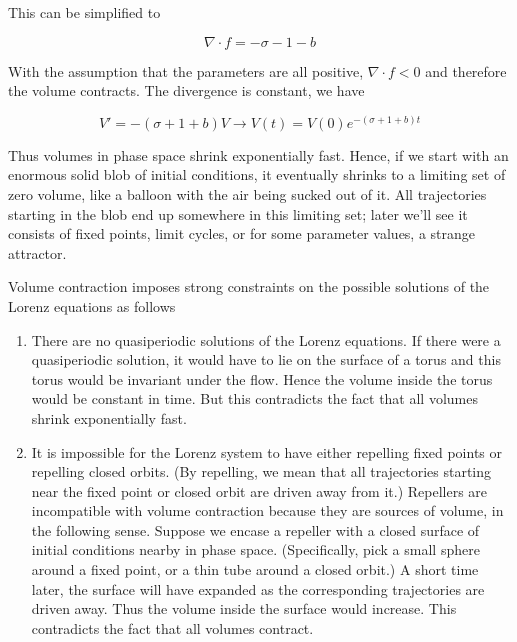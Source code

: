 This can be simplified to

\begin{equation*}
    \nabla \cdot f = - \sigma - 1 - b
\end{equation*}

With the assumption that the parameters are all positive, $\nabla \cdot f < 0$ and therefore the volume contracts. The divergence is constant, we have

\begin{equation*}
    V' = - (\sigma + 1 + b)V \rightarrow V(t) = V(0) e^{ - (\sigma + 1 + b) t}
\end{equation*}

Thus volumes in phase space shrink exponentially fast. Hence, if we start with an enormous solid blob of initial conditions, it eventually shrinks to a limiting set of zero volume, like a balloon with the air being sucked out of it. All trajectories starting in  the blob end up somewhere in this limiting set; later we’ll see it consists of fixed points, limit cycles, or for some parameter values, a strange attractor.

Volume contraction imposes strong constraints on the possible solutions of the Lorenz equations as follows

\begin{enumerate}
    \item There are no quasiperiodic solutions of the Lorenz equations. If there were a quasiperiodic solution, it would have to lie on  the surface of a torus and this torus would be invariant under the flow. Hence the volume inside the torus would be constant in time. But this contradicts the fact that all volumes shrink exponentially fast.
    \item It is impossible for the Lorenz system to have either repelling fixed points or repelling closed orbits. (By repelling, we mean that all trajectories starting near the fixed point or closed orbit are driven away from it.) Repellers are incompatible with volume contraction because they are sources of volume, in the following sense. Suppose we encase a repeller with a closed surface of initial conditions nearby in phase space. (Specifically, pick a small sphere around a fixed point, or a thin tube around a closed orbit.) A short time later, the surface will have expanded as the corresponding trajectories are driven away. Thus the volume inside the surface would increase. This contradicts the fact that all volumes contract.
\end{enumerate}



